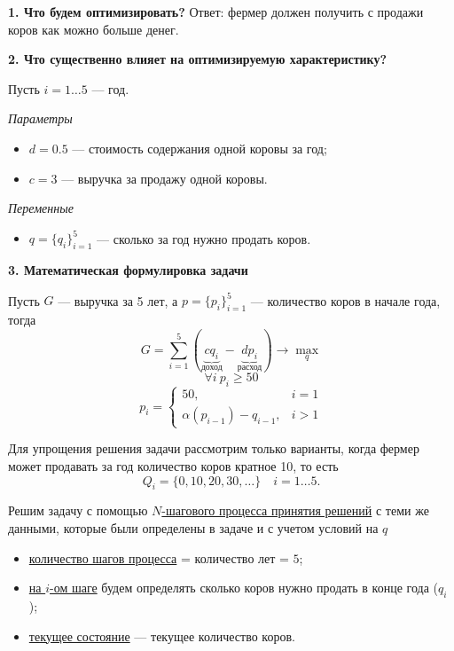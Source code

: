 \bigskip

\textbf{1. Что будем оптимизировать?} Ответ: фермер должен получить с продажи коров как можно больше денег.

\bigskip

\textbf{2. Что существенно влияет на оптимизируемую характеристику?}

Пусть $i = 1 \dots 5$ --- год.

\bigskip

\textit{Параметры}

\begin{itemize}[nosep]
	\item $d = 0.5$ --- стоимость содержания одной коровы за год;
	
	\item $c = 3$ --- выручка за продажу одной коровы.
\end{itemize}

\bigskip

\textit{Переменные}

\begin{itemize}[nosep]	
	\item $q = \{q_i\}_{i=1}^5$ --- сколько за год нужно продать коров.
\end{itemize}

\bigskip

\textbf{3. Математическая формулировка задачи}

Пусть $G$ --- выручка за 5 лет, а $p = \{p_i\}_{i=1}^5$ --- количество коров в начале года, тогда
\[G = \sum_{i=1}^{5} (\underbrace{c q_i}_{\text{доход}} - \underbrace{d p_i}_{\text{расход}}) \to \max_{q}\]
\[\forall  i \ p_i \ge 50\]
\[p_i = \begin{cases}\tag{*}
	50,& i = 1 \\
	\alpha(p_{i - 1}) - q_{i - 1},& i > 1
\end{cases}
\]

\solution
Для упрощения решения задачи рассмотрим только варианты, когда фермер может продавать за год количество коров кратное 10, то есть
\[
Q_i = \{0, 10, 20, 30, \dots\} \quad i = 1 \dots 5.
\]

Решим задачу с помощью \hyperref[n_step_process]{$N$-шагового процесса принятия решений} с теми же данными, которые были определены в задаче и с учетом условий на $q$

\begin{itemize}[nosep]
	\item \underline{количество шагов процесса} = количество лет = $5$;
	
	\item \underline{на $i$-ом шаге} будем определять сколько коров нужно продать в конце года ($q_i$);
	
	\item \underline{текущее состояние} --- текущее количество коров.
\end{itemize}

